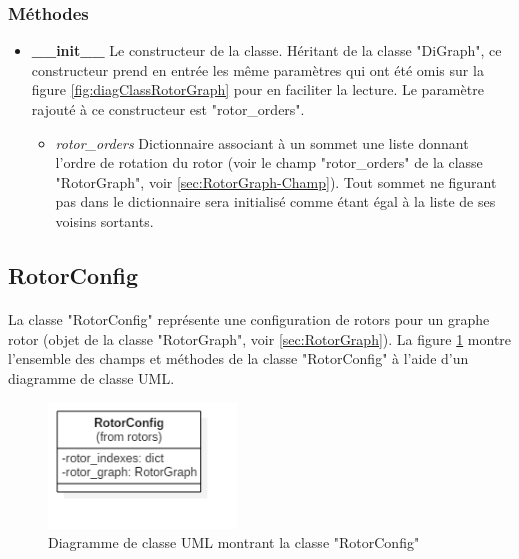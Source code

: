 \documentclass{article}
\begin{document}
			\subsubsection{Méthodes}
				\begin{itemize}
					\item \textbf{\_\_init\_\_}\newline
					Le constructeur de la classe. Héritant de la classe "DiGraph", ce constructeur prend en entrée les même paramètres qui ont été omis sur la figure \ref{fig:diagClassRotorGraph} pour en faciliter la lecture. Le paramètre rajouté à ce constructeur est "rotor\_orders".
					\begin{itemize}
						\item \textit{rotor\_orders}\newline
						Dictionnaire associant à un sommet une liste donnant l'ordre de rotation du rotor (voir le champ "rotor\_orders" de la classe "RotorGraph", voir \ref{sec:RotorGraph-Champ}). Tout sommet ne figurant pas dans le dictionnaire sera initialisé comme étant égal à la liste de ses voisins sortants. 
					\end{itemize}
				\end{itemize}
	
		\subsection{RotorConfig}
			\paragraph*{}
			La classe "RotorConfig" représente une configuration de rotors pour un graphe rotor (objet de la classe "RotorGraph", voir \ref{sec:RotorGraph}). La figure \ref{fig:diagClassRotorConfig} montre l'ensemble des champs et méthodes de la classe "RotorConfig" à l'aide d'un diagramme de classe UML.
			
			\begin{figure}[h]
				\includegraphics[width=5cm]{diagClassRotorConfig.png}
				\centering
				\caption{Diagramme de classe UML montrant la classe "RotorConfig"}
				\label{fig:diagClassRotorConfig}
			\end{figure}
			
\end{document}

